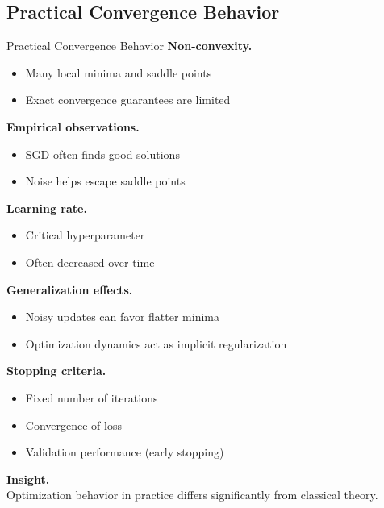 \documentclass[aspectratio=169,11pt]{beamer}
\begin{document}
\subsection{Practical Convergence Behavior}
\begin{frame}[t,allowframebreaks]{Practical Convergence Behavior}
\small
\textbf{Non-convexity.}\\ \begin{itemize}
    \item Many local minima and saddle points
    \item Exact convergence guarantees are limited
\end{itemize}

\textbf{Empirical observations.}\\ \begin{itemize}
    \item SGD often finds good solutions
    \item Noise helps escape saddle points
\end{itemize}

\textbf{Learning rate.}\\ \begin{itemize}
    \item Critical hyperparameter
    \item Often decreased over time
\end{itemize}

\textbf{Generalization effects.}\\ \begin{itemize}
    \item Noisy updates can favor flatter minima
    \item Optimization dynamics act as implicit regularization
\end{itemize}

\textbf{Stopping criteria.}\\ \begin{itemize}
    \item Fixed number of iterations
    \item Convergence of loss
    \item Validation performance (early stopping)
\end{itemize}

\textbf{Insight.}\\ Optimization behavior in practice differs significantly from classical theory.
\end{frame}
\end{document}
